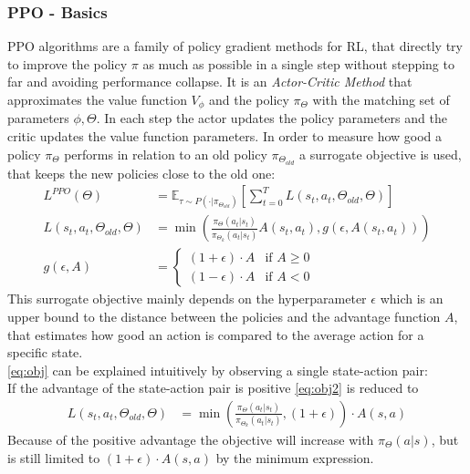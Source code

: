 \subsubsection{PPO - Basics} \label{sec:ppo}
PPO algorithms \cite{schulman2017proximal} are a family of policy gradient methods for RL, 
that directly try to improve the policy $\pi$ as much as possible in a single step without stepping to far and avoiding performance collapse. 
It is an \emph{Actor-Critic Method} that approximates the value function $V_{\phi}$ and the policy $\pi_{\Theta}$ with the matching set of parameters $\phi, \Theta$. 
In each step the actor updates the policy parameters and the critic updates the value function parameters. 
In order to measure how good a policy $\pi_{\Theta}$ performs in relation to an old policy $\pi_{\Theta_{old}}$ a surrogate objective is used, 
that keeps the new policies close to the old one:
\begin{align}
	L^{PPO} (\Theta) &= \mathbb{E}_{\tau \sim P(\cdot | \pi_{\Theta_{old}})}[\sum_{t=0}^{T} L(s_t, a_t, \Theta_{old}, \Theta)] \label{eq:obj} \\
	L(s_t, a_t, \Theta_{old}, \Theta) &= \min (
	\frac{\pi_{\Theta}(a_t|s_t)}{\pi_{\Theta_k}(a_t|s_t)} A(s_t, a_t), g(\epsilon, A(s_t, a_t))) \label{eq:obj2}\\
	g(\epsilon, A) &= 
	\left\{
	\begin{array}{ll}
		(1 + \epsilon) \cdot  A  & \mbox{if } A \geq 0\\
		(1 - \epsilon) \cdot A & \mbox{if } A < 0
	\end{array}
	\right. \label{eq:g}
\end{align}
\newline
This surrogate objective mainly depends on the hyperparameter $\epsilon$ which is an upper bound to the distance 
between the policies and the advantage function $A$, that estimates how good an action is compared to the average action for a specific state.\\
\cref{eq:obj} can be explained intuitively by observing a single state-action pair:\\
If the advantage of the state-action pair is positive \cref{eq:obj2} is reduced to
\begin{align}
	L(s_t, a_t, \Theta_{old}, \Theta) &= \min (\frac{\pi_{\Theta}(a_t|s_t)}{\pi_{\Theta_k}(a_t|s_t)}, (1 + \epsilon)) \cdot A(s,a)
\end{align}
Because of the positive advantage the objective will increase with $\pi_{\Theta} (a|s)$, 
but is still limited to $(1 + \epsilon) \cdot A(s,a)$ by the minimum expression. \\
